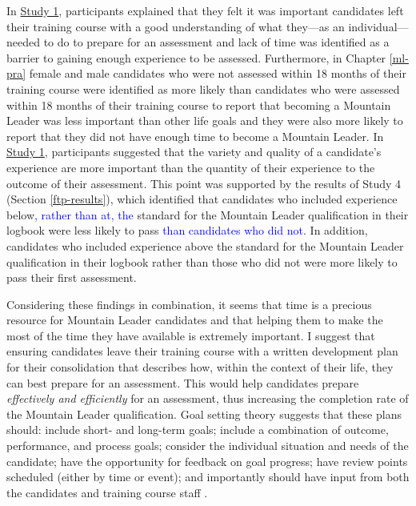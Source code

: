 \documentclass[
  12pt,
  a4paper,
]{book}
\begin{document}
In \protect\hyperlink{ml-qualitative}{Study 1}, participants explained that they felt it was important candidates left their training course with a good understanding of what they---as an individual---needed to do to prepare for an assessment and lack of time was identified as a barrier to gaining enough experience to be assessed. Furthermore, in Chapter \ref{ml-pra} female and male candidates who were not assessed within 18 months of their training course were identified as more likely than candidates who were assessed within 18 months of their training course to report that becoming a Mountain Leader was less important than other life goals and they were also more likely to report that they did not have enough time to become a Mountain Leader. In \protect\hyperlink{ml-qualitative}{Study 1}, participants suggested that the variety and quality of a candidate's experience are more important than the quantity of their experience to the outcome of their assessment. This point was supported by the results of Study 4 (Section \ref{ftp-results}), which identified that candidates who included experience below\textcolor{blue}{, rather than at, the} standard for the Mountain Leader qualification in their logbook were less likely to pass \textcolor{blue}{than candidates who did not}. In addition, candidates who included experience above the standard for the Mountain Leader qualification in their logbook rather than those who did not were more likely to pass their first assessment.

Considering these findings in combination, it seems that time is a precious resource for Mountain Leader candidates and that helping them to make the most of the time they have available is extremely important. I suggest that ensuring candidates leave their training course with a written development plan for their consolidation that describes how, within the context of their life, they can best prepare for an assessment. This would help candidates prepare \emph{effectively and efficiently} for an assessment, thus increasing the completion rate of the Mountain Leader qualification. Goal setting theory suggests that these plans should: include short- and long-term goals; include a combination of outcome, performance, and process goals; consider the individual situation and needs of the candidate; have the opportunity for feedback on goal progress; have review points scheduled (either by time or event); and importantly should have input from both the candidates and training course staff \citep[cf.~][]{Gould2005, Weinberg2014}.
\end{document}
